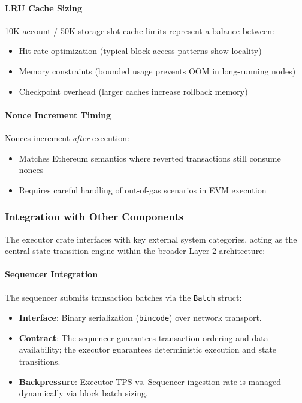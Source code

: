 \paragraph{LRU Cache Sizing}
10K account / 50K storage slot cache limits represent a balance between:
\begin{itemize}[leftmargin=*]
    \item Hit rate optimization (typical block access patterns show locality)
    \item Memory constraints (bounded usage prevents OOM in long-running nodes)
    \item Checkpoint overhead (larger caches increase rollback memory)
\end{itemize}

\paragraph{Nonce Increment Timing}
Nonces increment \textit{after} execution:
\begin{itemize}[leftmargin=*]
    \item Matches Ethereum semantics where reverted transactions still consume nonces
    \item Requires careful handling of out-of-gas scenarios in EVM execution
\end{itemize}



\subsubsection{Integration with Other Components}
\label{sec:integration}

The executor crate interfaces with key external system categories, acting as the central state-transition engine within the broader Layer-2 architecture:

\paragraph{Sequencer Integration}
The sequencer submits transaction batches via the \texttt{Batch} struct:
\begin{itemize}[leftmargin=*]
    \item \textbf{Interface}: Binary serialization (\texttt{bincode}) over network transport.
    \item \textbf{Contract}: The sequencer guarantees transaction ordering and data availability; the executor guarantees deterministic execution and state transitions.
    \item \textbf{Backpressure}: Executor TPS vs. Sequencer ingestion rate is managed dynamically via block batch sizing.
\end{itemize}

